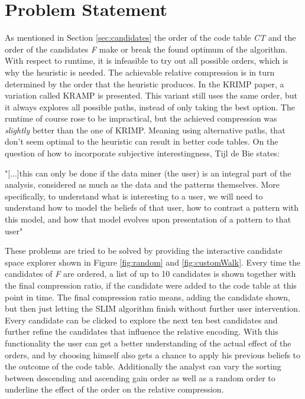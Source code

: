 \documentclass[runningheads]{llncs}
\begin{document}
\section{Problem Statement}
\label{sec:problem}
As mentioned in Section \ref{sec:candidates} the order of the code table \emph{CT} and the order of the candidates \emph{F} make or break the found optimum of the algorithm.
With respect to runtime, it is infeasible to try out all possible orders, which is why the heuristic is needed.
The achievable relative compression is in turn determined by the order that the heuristic produces.
In the KRIMP paper, a variation called KRAMP is presented. This variant still uses the same order, but it always explores all possible paths, instead of only taking the best option.
The runtime of course rose to be impractical, but the achieved compression was \emph{slightly} better than the one of KRIMP. Meaning using alternative paths, that don't seem optimal to the heuristic can result in better code tables.
On the question of how to incorporate subjective interestingness, Tijl de Bie states:

"[...]this can only be done if the
data miner (the user) is an integral part of the analysis, considered as much as
the data and the patterns themselves. More specifically, to understand what is
interesting to a user, we will need to understand how to model the beliefs of that
user, how to contrast a pattern with this model, and how that model evolves
upon presentation of a pattern to that user"\cite{de2013subjective}

These problems are tried to be solved by providing the interactive candidate space explorer shown in Figure \ref{fig:random} and \ref{fig:customWalk}.
Every time the candidates of \emph{F} are ordered, a list of up to 10 candidates is shown together with the final compression ratio, if the candidate were added to the code table at this point in time.
The final compression ratio means, adding the candidate shown, but then just letting the SLIM algorithm finish without further user intervention.
Every candidate can be clicked to explore the next ten best candidates and further refine the candidates that influence the relative encoding.
With this functionality the user can get a better understanding of the actual effect of the orders, and by choosing himself also gets a chance to apply his previous beliefs to the outcome of the code table.
Additionally the analyst can vary the sorting between descending and ascending gain order as well as a random order to underline the effect of the order on the relative compression.
\end{document}
